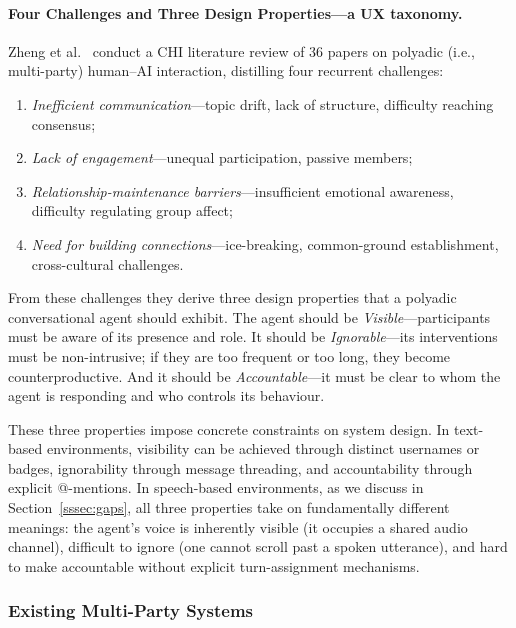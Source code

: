 \paragraph{Four Challenges and Three Design Properties---a UX taxonomy.}
Zheng et al.~\cite{zheng2022polyadic} conduct a CHI literature review of 36
papers on polyadic (i.e., multi-party) human--AI interaction, distilling four
recurrent challenges:
\begin{enumerate}[nosep]
  \item \emph{Inefficient communication}---topic drift, lack of structure,
    difficulty reaching consensus;
  \item \emph{Lack of engagement}---unequal participation, passive members;
  \item \emph{Relationship-maintenance barriers}---insufficient emotional
    awareness, difficulty regulating group affect;
  \item \emph{Need for building connections}---ice-breaking, common-ground
    establishment, cross-cultural challenges.
\end{enumerate}

From these challenges they derive three design properties that a polyadic
conversational agent should exhibit.  The agent should be
\emph{Visible}---participants must be aware of its presence and role.  It
should be \emph{Ignorable}---its interventions must be non-intrusive; if they
are too frequent or too long, they become counterproductive.  And it should be
\emph{Accountable}---it must be clear to whom the agent is responding and who
controls its behaviour.

These three properties impose concrete constraints on system design.  In
text-based environments, visibility can be achieved through distinct usernames
or badges, ignorability through message threading, and accountability through
explicit @-mentions.  In speech-based environments, as we discuss in
Section~\ref{sssec:gaps}, all three properties take on fundamentally different
meanings: the agent's voice is inherently visible (it occupies a shared audio
channel), difficult to ignore (one cannot scroll past a spoken utterance), and
hard to make accountable without explicit turn-assignment mechanisms.

\subsubsection{Existing Multi-Party Systems}
\label{sssec:multiparty-systems}

